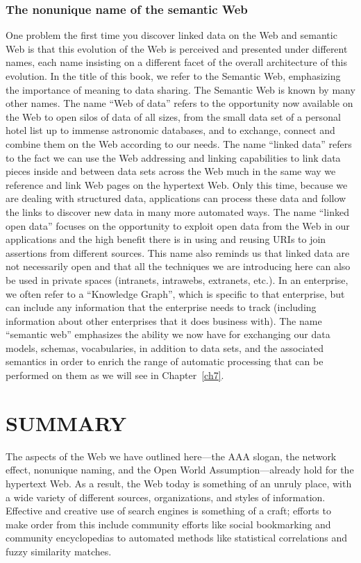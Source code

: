 \subsubsection{The nonunique name of the semantic Web}

One problem the first time you discover linked data on the Web and
semantic Web is that this evolution of the Web is perceived and
presented under different names, each name insisting on a different
facet of the overall architecture of this evolution. In the title of
this book, we refer to the Semantic Web, emphasizing the importance of
meaning to data sharing. The Semantic Web is known by many other names.
The name ``Web of data'' refers to the opportunity now available on the
Web to open silos of data of all sizes, from the small data set of a
personal hotel list up to immense astronomic databases, and to exchange,
connect and combine them on the Web according to our needs. The name
``linked data'' refers to the fact we can use the Web addressing and
linking capabilities to link data pieces inside and between data sets
across the Web much in the same way we reference and link Web pages on
the hypertext Web. Only this time, because we are dealing with structured
data, applications can process these data and follow the links to
discover new data in many more automated ways. The name ``linked open
data'' focuses on the opportunity to exploit open data from the Web in
our applications and the high benefit there is in using and reusing URIs
to join assertions from different sources. This name also reminds us
that linked data are not necessarily open and that all the techniques we
are introducing here can also be used in private spaces (intranets,
intrawebs, extranets, etc.). In an enterprise, we often refer to a
``Knowledge Graph'', which is specific to that enterprise, but can
include any information that the enterprise needs to track (including
information about other enterprises that it does business with). 
The name ``semantic web'' emphasizes the ability
we now have for exchanging our data models, schemas, vocabularies, in
addition to data sets, and the associated semantics in order to enrich
the range of automatic processing that can be performed on them as we
will see in Chapter~\ref{ch7}.

\section{SUMMARY}

The aspects of the Web we have outlined here---the AAA slogan, the
network effect, nonunique naming, and the Open World
Assumption---already hold for the hypertext Web. As a result, the Web
today is something of an unruly place, with a wide variety of different
sources, organizations, and styles of information. Effective and
creative use of search engines is something of a craft; efforts to make
order from this include community efforts like social bookmarking and
community encyclopedias to automated methods like statistical
correlations and fuzzy similarity matches.

